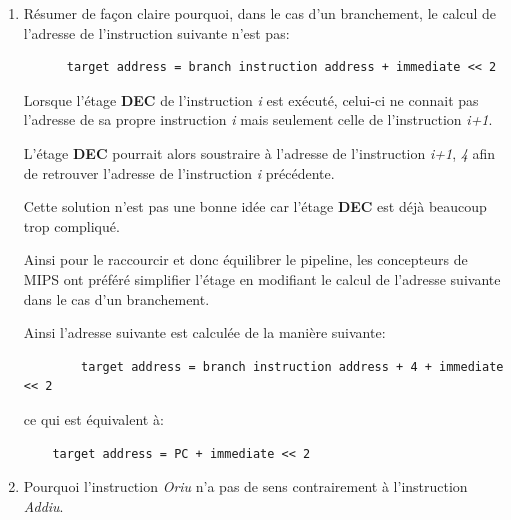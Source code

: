 {\begin{enumerate}
\begin{correction}
      Puisque l'instruction \textit{Andi} est une op\'eration logique
      et non arithm\'etique, l'imm\'ediat sera consid\'er\'e comme
      un nombre non-sign\'e.

      De ce fait les 16 bits de poids forts seront tous simplement
      remplis de z\'eros et l'op\'eration pourra \^etre effectu\'ee
      correctement.

    \end{correction}
  \item
    R\'esumer de fa\c{c}on claire pourquoi, dans le cas d'un branchement,
    le calcul de l'adresse de l'instruction suivante n'est pas:

    \begin{verbatim}
      target address = branch instruction address + immediate << 2
    \end{verbatim}

    \begin{correction}

      Lorsque l'\'etage \textbf{DEC} de l'instruction \textit{i} est
      ex\'ecut\'e, celui-ci ne connait pas l'adresse de sa propre instruction
      \textit{i} mais seulement celle de l'instruction \textit{i+1}.

      L'\'etage \textbf{DEC} pourrait alors soustraire \`a l'adresse de
      l'instruction \textit{i+1}, \textit{4} afin de retrouver l'adresse
      de l'instruction \textit{i} pr\'ec\'edente.

      Cette solution n'est pas une bonne id\'ee car l'\'etage \textbf{DEC}
      est d\'ej\`a beaucoup trop compliqu\'e.

      Ainsi pour le raccourcir et donc \'equilibrer le pipeline, les
      concepteurs de MIPS ont pr\'ef\'er\'e simplifier l'\'etage en
      modifiant le calcul de l'adresse suivante dans le cas d'un branchement.

      Ainsi l'adresse suivante est calcul\'ee de la mani\`ere suivante:

      \begin{verbatim}
        target address = branch instruction address + 4 + immediate << 2
      \end{verbatim}

      ce qui est \'equivalent \`a:

      \begin{verbatim}
	target address = PC + immediate << 2
      \end{verbatim}

    \end{correction}
  \item
    Pourquoi l'instruction \textit{Oriu} n'a pas de sens contrairement
    \`a l'instruction \textit{Addiu}.


\end{enumerate}}
